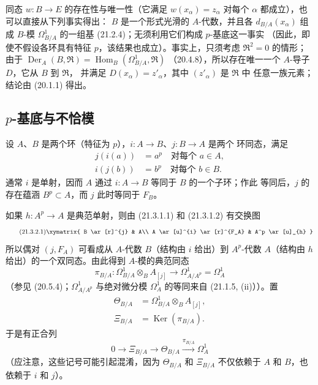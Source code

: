 \begin{remark}[21.2.8]
\label{0.21.2.8-fr}
同态 $w:B\to E$ 的存在性与唯一性（它满足
$w(x_\alpha)=z_\alpha$ 对每个 $\alpha$ 都成立），也可以直接从下列事实得出：
$B$ 是一个形式光滑的 $A$-代数，并且各 $d_{B/A}(x_\alpha)$ 组成 $B$-模
$\Omega^1_{B/A}$ 的一组基 (21.2.4)；无须利用它们构成 $p$-基底这一事实
（因此，即使不假设各环具有特征 $p$，该结果也成立）。事实上，只须考虑
$\mathfrak R^2=0$ 的情形；由于
$\operatorname{Der}_A(B,\mathfrak R)=\operatorname{Hom}_B(\Omega^1_{B/A},\mathfrak R)$
（20.4.8），所以存在唯一一个 $A$-导子 $D$，它从 $B$ 到 $\mathfrak R$，
并满足 $D(x_\alpha)=z'_\alpha$，其中 $(z'_\alpha)$ 是 $\mathfrak R$ 中
任意一族元素；结论由 (20.1.1) 得出。
\end{remark}

\subsection{$p$-基底与不恰模}
\label{0.21.3-fr}

\begin{env}[21.3.1]
\label{0.21.3.1-fr}
设 $A$、$B$ 是两个环（特征为 $p$），$i:A\to B$、$j:B\to A$ 是两个
环同态，满足
\begin{align}
\tag{21.3.1.1}\label{0.21.3.1.1-fr}
j(i(a))&=a^p\quad\text{对每个 }a\in A,\\
\tag{21.3.1.2}\label{0.21.3.1.2-fr}
i(j(b))&=b^p\quad\text{对每个 }b\in B.
\end{align}
通常 $i$ 是单射，因而 $A$ 通过 $i:A\to B$ 等同于 $B$ 的一个子环；作此
等同后，$j$ 的存在蕴涵 $B^p\subset A$，而 $j$ 此时等同于 $F_B$。
\end{env}

\begin{env}[21.3.2]
\label{0.21.3.2-fr}
如果 $h:A^p\to A$ 是典范单射，则由 (21.3.1.1) 和 (21.3.1.2) 有交换图
\begin{equation}
\tag{21.3.2.1}\label{0.21.3.2.1-fr}
\xymatrix{
 B \ar[r]^{j} & A\\
 A \ar[u]^{i} \ar[r]^{F_A} & A^p \ar[u]_{h}
}
\end{equation}
所以偶对 $(j,F_A)$ 可看成从 $A$-代数 $B$（结构由 $i$ 给出）到
$A^p$-代数 $A$（结构由 $h$ 给出）的一个双同态。由此得到 $A$-模的典范同态
\begin{equation}
\tag{21.3.2.2}\label{0.21.3.2.2-fr}
\pi_{B/A}:\Omega^1_{B/A}\otimes_B A_{[j]}\longrightarrow
\Omega^1_{A/A^p}=\Omega^1_A
\end{equation}
（参见 (20.5.4)；$\Omega^1_{A/A^p}$ 与绝对微分模 $\Omega^1_A$ 的等同来自
(21.1.5, (ii)））。置
\begin{align}
\tag{21.3.2.3}\label{0.21.3.2.3-fr}
\Theta_{B/A}&=\Omega^1_{B/A}\otimes_B A_{[j]},\\
\tag{21.3.2.4}\label{0.21.3.2.4-fr}
\Xi_{B/A}&=\operatorname{Ker}(\pi_{B/A}).
\end{align}
于是有正合列
\begin{equation}
\tag{21.3.2.5}\label{0.21.3.2.5-fr}
0\to\Xi_{B/A}\to\Theta_{B/A}\xrightarrow{\pi_{B/A}}\Omega^1_A
\end{equation}
（应注意，这些记号可能引起混淆，因为 $\Theta_{B/A}$ 和 $\Xi_{B/A}$ 不仅依赖于
$A$ 和 $B$，也依赖于 $i$ 和 $j$）。
\end{env}

